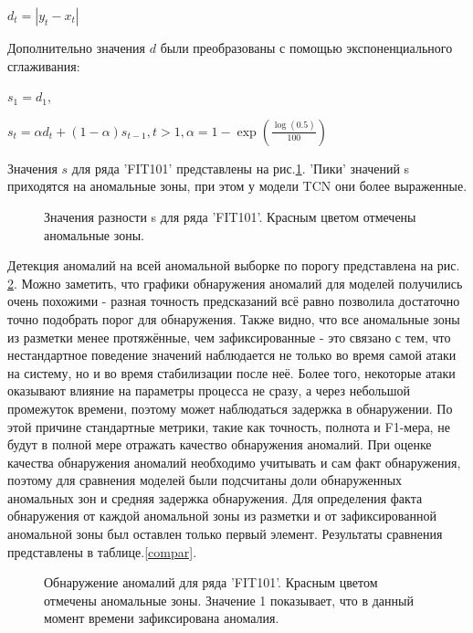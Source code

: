 \documentclass{article}
\begin{document}
$d_t = |y_t - x_t|$

Дополнительно значения $d$ были преобразованы с помощью экспоненциального сглаживания: 

$s_1 = d_1,$

$s_t = \alpha d_t + (1 - \alpha)s_{t-1},  t > 1,  \alpha = 1 - \exp(\frac{\log(0.5)}{100})$

Значения $s$ для ряда 'FIT101' представлены на рис.\ref{FIT101_S}. 'Пики' значений s приходятся на аномальные зоны, при этом у модели TCN они более выраженные.

\begin{figure}[H]
\centering
{}%
\hfill
{}%
\caption{Значения разности s для ряда 'FIT101'. Красным цветом отмечены аномальные зоны.}
\label{FIT101_S}
\end{figure}

Детекция аномалий на всей аномальной выборке по порогу представлена на рис. \ref{FIT101_D}. Можно заметить, что графики обнаружения аномалий для моделей получились очень похожими - разная точность предсказаний всё равно позволила достаточно точно подобрать порог для обнаружения. Также видно, что все аномальные зоны из разметки менее протяжённые, чем зафиксированные - это связано с тем, что нестандартное поведение значений наблюдается не только во время самой атаки на систему, но и во время стабилизации после неё. Более того, некоторые атаки оказывают влияние на параметры процесса не сразу, а через небольшой промежуток времени, поэтому может наблюдаться задержка в обнаружении. По этой причине стандартные метрики, такие как точность, полнота и F1-мера, не будут в полной мере отражать качество обнаружения аномалий. При оценке качества обнаружения аномалий необходимо учитывать и сам факт обнаружения, поэтому для сравнения моделей были подсчитаны доли обнаруженных аномальных зон и средняя задержка обнаружения. Для определения факта обнаружения от каждой аномальной зоны из разметки и от зафиксированной аномальной зоны был оставлен только первый элемент. Результаты сравнения представлены в таблице.\ref{compar}. 

\begin{figure}[H]
\centering
{}%
\hfill
{}%
\caption{Обнаружение аномалий для ряда 'FIT101'. Красным цветом отмечены аномальные зоны. Значение 1 показывает, что в данный момент времени зафиксирована аномалия.}
\label{FIT101_D}
\end{figure}
\end{document}
